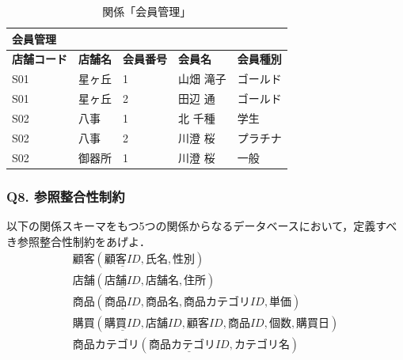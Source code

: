 \begin{table}[tb]
\centering
\caption{関係「会員管理」}
\begin{tabular}{@{}lllll@{}}
会員管理 &            &             &               &               \\ \midrule
\textbf{店舗コード} & \textbf{店舗名} & \textbf{会員番号} & \textbf{会員名} & \textbf{会員種別} \\ \midrule
S01            & 星ヶ丘          & 1             & 山畑 滝子        & ゴールド          \\
S01            & 星ヶ丘          & 2             & 田辺 通         & ゴールド          \\
S02            & 八事           & 1             & 北 千種         & 学生            \\
S02            & 八事           & 2             & 川澄 桜         & プラチナ          \\
S02            & 御器所          & 1             & 川澄 桜         & 一般            \\ \bottomrule
\end{tabular}
\label{tab:membership-management}
\end{table}


\subsubsection{Q8. 参照整合性制約}
以下の関係スキーマをもつ5つの関係からなるデータベースにおいて，定義すべき参照整合性制約をあげよ．
\begin{eqnarray}
顧客(\underline{顧客ID}, 氏名, 性別) \\
店舗(\underline{店舗ID}, 店舗名, 住所) \\
商品(\underline{商品ID}, 商品名, 商品カテゴリID, 単価) \\
購買(\underline{購買ID}, 店舗ID, 顧客ID, 商品ID, 個数, 購買日) \\
商品カテゴリ(\underline{商品カテゴリID}, カテゴリ名)
\end{eqnarray}
